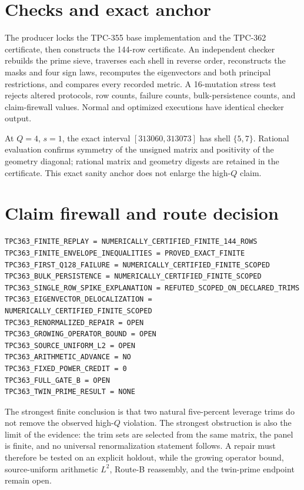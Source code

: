 \documentclass[10pt]{article}
\begin{document}
\section{Checks and exact anchor}

The producer locks the TPC-355 base implementation and the TPC-362
certificate, then constructs the 144-row certificate.  An independent
checker rebuilds the prime sieve, traverses each shell in reverse order,
reconstructs the masks and four sign laws, recomputes the eigenvectors and
both principal restrictions, and compares every recorded metric.  A
16-mutation stress test rejects altered protocols, row counts, failure counts,
bulk-persistence counts, and claim-firewall values.  Normal and optimized
executions have identical checker output.

At $Q=4$, $s=1$, the exact interval $[313060,313073]$ has shell $\{5,7\}$.
Rational evaluation confirms symmetry of the unsigned matrix and positivity
of the geometry diagonal; rational matrix and geometry digests are retained
in the certificate.  This exact sanity anchor does not enlarge the
high-$Q$ claim.

\section{Claim firewall and route decision}

\begin{verbatim}
TPC363_FINITE_REPLAY = NUMERICALLY_CERTIFIED_FINITE_144_ROWS
TPC363_FINITE_ENVELOPE_INEQUALITIES = PROVED_EXACT_FINITE
TPC363_FIRST_Q128_FAILURE = NUMERICALLY_CERTIFIED_FINITE_SCOPED
TPC363_BULK_PERSISTENCE = NUMERICALLY_CERTIFIED_FINITE_SCOPED
TPC363_SINGLE_ROW_SPIKE_EXPLANATION = REFUTED_SCOPED_ON_DECLARED_TRIMS
TPC363_EIGENVECTOR_DELOCALIZATION = NUMERICALLY_CERTIFIED_FINITE_SCOPED
TPC363_RENORMALIZED_REPAIR = OPEN
TPC363_GROWING_OPERATOR_BOUND = OPEN
TPC363_SOURCE_UNIFORM_L2 = OPEN
TPC363_ARITHMETIC_ADVANCE = NO
TPC363_FIXED_POWER_CREDIT = 0
TPC363_FULL_GATE_B = OPEN
TPC363_TWIN_PRIME_RESULT = NONE
\end{verbatim}

The strongest finite conclusion is that two natural five-percent leverage
trims do not remove the observed high-$Q$ violation.  The strongest
obstruction is also the limit of the evidence: the trim sets are selected
from the same matrix, the panel is finite, and no universal renormalization
statement follows.  A repair must therefore be tested on an explicit
holdout, while the growing operator bound, source-uniform arithmetic $L^2$,
Route-B reassembly, and the twin-prime endpoint remain open.
\end{document}

